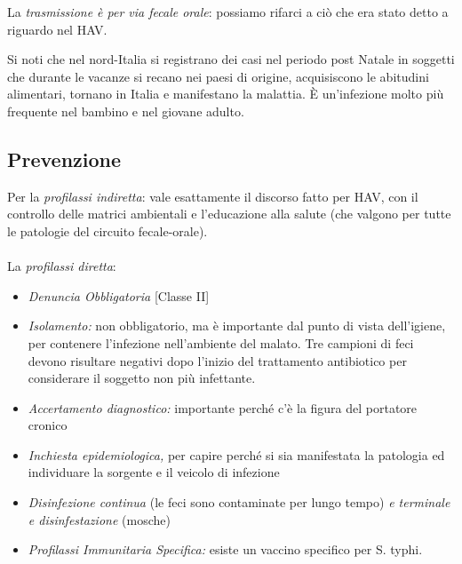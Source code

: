 La \emph{trasmissione è per via fecale orale}: possiamo rifarci a ciò
che era stato detto a riguardo nel HAV.

Si noti che nel nord-Italia si registrano dei casi nel periodo post
Natale in soggetti che durante le vacanze si recano nei paesi di
origine, acquisiscono le abitudini alimentari, tornano in Italia e
manifestano la malattia. È un'infezione molto più frequente nel bambino
e nel giovane adulto.

\subsection{Prevenzione}


Per la \emph{profilassi indiretta}: vale esattamente il discorso fatto
per HAV, con il controllo delle matrici ambientali e l'educazione alla
salute (che valgono per tutte le patologie del circuito fecale-orale).
\\\\
La \emph{profilassi diretta}:

\begin{itemize}
\item
   
  \emph{Denuncia Obbligatoria} {[}Classe II{]}
   
\item
   
  \emph{Isolamento:} non obbligatorio, ma è importante dal punto di
  vista dell'igiene, per contenere l'infezione nell'ambiente del malato.
  Tre campioni di feci devono risultare negativi dopo l'inizio del
  trattamento antibiotico per considerare il soggetto non più
  infettante.
   
\item
   
  \emph{Accertamento diagnostico:} importante perché c'è la figura del
  portatore cronico
   
\item
   
  \emph{Inchiesta epidemiologica,} per capire perché si sia manifestata
  la patologia ed individuare la sorgente e il veicolo di infezione
   
\item
   
  \emph{Disinfezione continua} (le feci sono contaminate per lungo
  tempo) \emph{e terminale e disinfestazione} (mosche)
   
\item
   
  \emph{Profilassi Immunitaria Specifica:} esiste un vaccino specifico
  per S. typhi.
   
\end{itemize}

